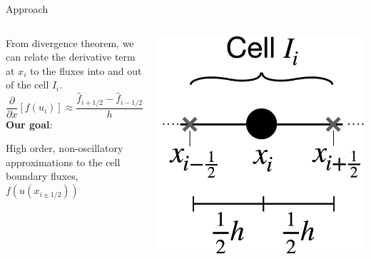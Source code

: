 \documentclass[10pt]{beamer}
\begin{document}
\begin{frame}{Approach}
\begin{columns}
  \begin{column}{0.65\textwidth}
    From divergence theorem, we can relate the derivative term at $x_i$ to the fluxes into and out of the cell $I_i$.
    $$
      \frac{\partial}{\partial x}[f(u_i)] \approx \frac{\hat{f}_{i+1 /2} - \hat{f}_{i-1/2}}{h}
    $$
    \textbf{Our goal}:

  High order, non-oscillatory approximations to the cell boundary fluxes, $f(u(x_{i\pm1/2}))$  
  \end{column}

  \begin{column}{0.3\textwidth}
  \vspace{\topsep}
  \includegraphics[scale=0.175]{CellGraphic.png}%
  \end{column}
    
  \end{columns}
\end{frame}
\end{document}
